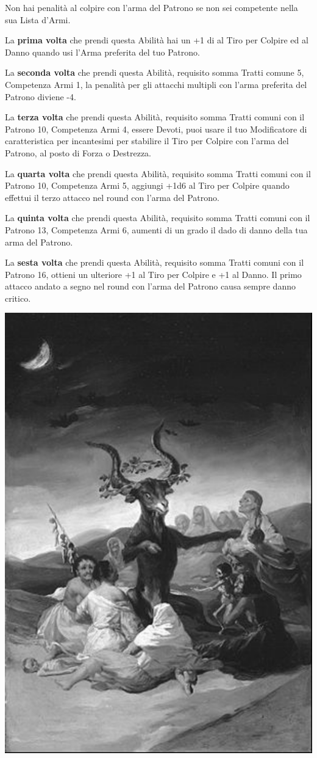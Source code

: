 \begin{multicols}{2}
Non hai penalità al colpire con l'arma del Patrono se non sei competente nella sua Lista d'Armi.

La \textbf{prima volta} che prendi questa Abilità hai un +1 di al Tiro per Colpire ed al Danno quando usi l'Arma preferita del tuo Patrono.

La \textbf{seconda volta} che prendi questa Abilità, requisito somma Tratti comune 5, Competenza Armi 1, la penalità per gli attacchi multipli con l'arma preferita del Patrono diviene -4.

La \textbf{terza volta} che prendi questa Abilità, requisito somma Tratti comuni con il Patrono 10, Competenza Armi 4, essere Devoti, puoi usare il tuo Modificatore di caratteristica per incantesimi per stabilire il Tiro per Colpire con l'arma del Patrono, al posto di Forza o Destrezza.

La \textbf{quarta volta} che prendi questa Abilità, requisito somma Tratti comuni con il Patrono 10, Competenza Armi 5, aggiungi +1d6 al Tiro per Colpire quando effettui il terzo attacco nel round con l'arma del Patrono.

La \textbf{quinta volta} che prendi questa Abilità, requisito somma Tratti comuni con il Patrono 13, Competenza Armi 6, aumenti di un grado il dado di danno della tua arma del Patrono.

La \textbf{sesta volta} che prendi questa Abilità, requisito somma Tratti comuni con il Patrono 16, ottieni un ulteriore +1 al Tiro per Colpire e +1 al Danno. Il primo attacco andato a segno nel round con l'arma del Patrono causa sempre danno critico.


\begin{center}
	\includegraphics[width=0.56\linewidth]{immagini/streghegoya.png}


\end{center}
\end{multicols}

